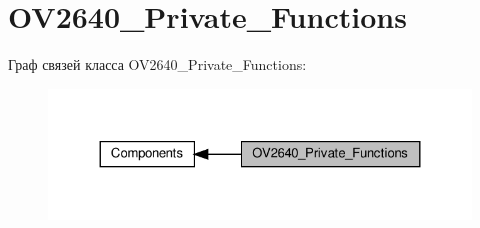 \hypertarget{group___o_v2640___private___functions}{}\section{O\+V2640\+\_\+\+Private\+\_\+\+Functions}
\label{group___o_v2640___private___functions}
Граф связей класса O\+V2640\+\_\+\+Private\+\_\+\+Functions\+:
\nopagebreak
\begin{figure}[H]
\begin{center}
\leavevmode
\includegraphics[width=324pt]{group___o_v2640___private___functions}
\end{center}
\end{figure}
